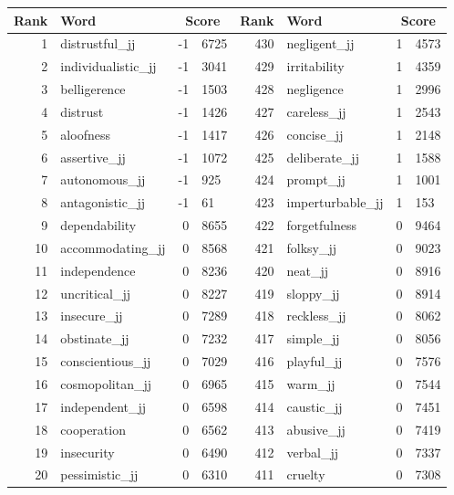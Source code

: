 \begin{table}[tbp]
    \begin{tabular}{| rlr@{.}l | rlr@{.}l |}
    \hline
    \textbf{Rank} & \textbf{Word} & \multicolumn{2}{c|}{\textbf{Score}} & \textbf{Rank} & \textbf{Word} & \multicolumn{2}{c|}{\textbf{Score}} \\
    \hline
    1 & distrustful\_jj & -1 & 6725    &    430 & negligent\_jj & 1 & 4573 \\
    2 & individualistic\_jj & -1 & 3041    &    429 & irritability & 1 & 4359 \\
    3 & belligerence & -1 & 1503    &    428 & negligence & 1 & 2996 \\
    4 & distrust & -1 & 1426    &    427 & careless\_jj & 1 & 2543 \\
    5 & aloofness & -1 & 1417    &    426 & concise\_jj & 1 & 2148 \\
    6 & assertive\_jj & -1 & 1072    &    425 & deliberate\_jj & 1 & 1588 \\
    7 & autonomous\_jj & -1 & 925    &    424 & prompt\_jj & 1 & 1001 \\
    8 & antagonistic\_jj & -1 & 61    &    423 & imperturbable\_jj & 1 & 153 \\
    9 & dependability & 0 & 8655    &    422 & forgetfulness & 0 & 9464 \\
    10 & accommodating\_jj & 0 & 8568    &    421 & folksy\_jj & 0 & 9023 \\
    11 & independence & 0 & 8236    &    420 & neat\_jj & 0 & 8916 \\
    12 & uncritical\_jj & 0 & 8227    &    419 & sloppy\_jj & 0 & 8914 \\
    13 & insecure\_jj & 0 & 7289    &    418 & reckless\_jj & 0 & 8062 \\
    14 & obstinate\_jj & 0 & 7232    &    417 & simple\_jj & 0 & 8056 \\
    15 & conscientious\_jj & 0 & 7029    &    416 & playful\_jj & 0 & 7576 \\
    16 & cosmopolitan\_jj & 0 & 6965    &    415 & warm\_jj & 0 & 7544 \\
    17 & independent\_jj & 0 & 6598    &    414 & caustic\_jj & 0 & 7451 \\
    18 & cooperation & 0 & 6562    &    413 & abusive\_jj & 0 & 7419 \\
    19 & insecurity & 0 & 6490    &    412 & verbal\_jj & 0 & 7337 \\
    20 & pessimistic\_jj & 0 & 6310    &    411 & cruelty & 0 & 7308 \\

\end{tabular}
\end{table}
